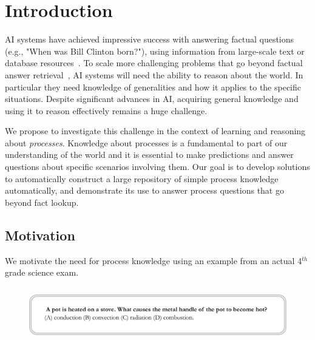 \section{Introduction}

AI systems have achieved impressive success with answering factual questions 
(e.g., "When was Bill Clinton born?"), using information from large-scale text or database resources~\cite{berant2013semantic,fader2014open,bordes2014open,reddy2014large,watson}. 
To scale more challenging problems that go beyond factual answer retrieval~\cite{richardson2013mctest,clark2015elementary,berantSrikumar14}, 
AI systems will need the ability to reason about the world. In particular they need knowledge of generalities 
and how it applies to the specific situations. Despite significant advances in AI, acquiring 
general knowledge and using it to reason effectively remains a huge challenge.

We propose to investigate this challenge in the context of learning and reasoning about {\em processes}.
Knowledge about processes is a fundamental to part of our understanding of the world and it is 
essential to make predictions and answer questions about specific scenarios involving them.
Our goal is to develop solutions to automatically construct a large repository of simple process knowledge 
automatically, and demonstrate its use to answer process questions that go beyond fact lookup. 

\subsection{Motivation}
We motivate the need for process knowledge using an example from an actual 4$^{th}$ grade science exam.
\begin{figure}[hbt]
	\begin{center}
	\vspace{-1em}
	\includegraphics[width=6.04in,height=0.95in]{figures/single-question-stretch.pdf} 	
	\vspace{-1em}
	\end{center}
\end{figure}

